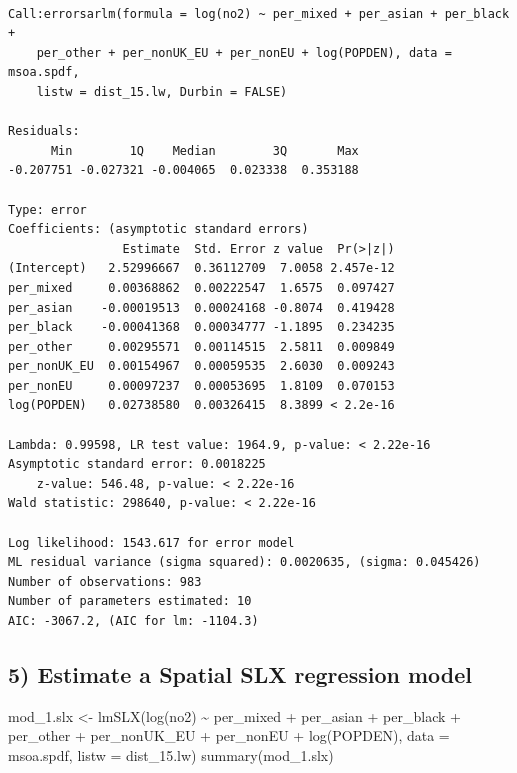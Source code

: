 \documentclass[
  letterpaper,
]{scrbook}
\newenvironment{Shaded}{\begin{snugshade}}{\end{snugshade}}
\newcommand{\AttributeTok}[1]{\textcolor[rgb]{0.40,0.45,0.13}{#1}}
\newcommand{\FunctionTok}[1]{\textcolor[rgb]{0.28,0.35,0.67}{#1}}
\newcommand{\NormalTok}[1]{\textcolor[rgb]{0.00,0.23,0.31}{#1}}
\newcommand{\OtherTok}[1]{\textcolor[rgb]{0.00,0.23,0.31}{#1}}
\newcommand{\SpecialCharTok}[1]{\textcolor[rgb]{0.37,0.37,0.37}{#1}}
\begin{document}
\begin{verbatim}

Call:errorsarlm(formula = log(no2) ~ per_mixed + per_asian + per_black + 
    per_other + per_nonUK_EU + per_nonEU + log(POPDEN), data = msoa.spdf, 
    listw = dist_15.lw, Durbin = FALSE)

Residuals:
      Min        1Q    Median        3Q       Max 
-0.207751 -0.027321 -0.004065  0.023338  0.353188 

Type: error 
Coefficients: (asymptotic standard errors) 
                Estimate  Std. Error z value  Pr(>|z|)
(Intercept)   2.52996667  0.36112709  7.0058 2.457e-12
per_mixed     0.00368862  0.00222547  1.6575  0.097427
per_asian    -0.00019513  0.00024168 -0.8074  0.419428
per_black    -0.00041368  0.00034777 -1.1895  0.234235
per_other     0.00295571  0.00114515  2.5811  0.009849
per_nonUK_EU  0.00154967  0.00059535  2.6030  0.009243
per_nonEU     0.00097237  0.00053695  1.8109  0.070153
log(POPDEN)   0.02738580  0.00326415  8.3899 < 2.2e-16

Lambda: 0.99598, LR test value: 1964.9, p-value: < 2.22e-16
Asymptotic standard error: 0.0018225
    z-value: 546.48, p-value: < 2.22e-16
Wald statistic: 298640, p-value: < 2.22e-16

Log likelihood: 1543.617 for error model
ML residual variance (sigma squared): 0.0020635, (sigma: 0.045426)
Number of observations: 983 
Number of parameters estimated: 10 
AIC: -3067.2, (AIC for lm: -1104.3)
\end{verbatim}

\hypertarget{estimate-a-spatial-slx-regression-model}{%
\subsection*{5) Estimate a Spatial SLX regression
model}\label{estimate-a-spatial-slx-regression-model}}

\begin{Shaded}
\begin{Highlighting}[]
\NormalTok{mod\_1.slx }\OtherTok{\textless{}{-}} \FunctionTok{lmSLX}\NormalTok{(}\FunctionTok{log}\NormalTok{(no2) }\SpecialCharTok{\textasciitilde{}}\NormalTok{ per\_mixed }\SpecialCharTok{+}\NormalTok{ per\_asian }\SpecialCharTok{+}\NormalTok{ per\_black }\SpecialCharTok{+}\NormalTok{ per\_other}
                      \SpecialCharTok{+}\NormalTok{ per\_nonUK\_EU }\SpecialCharTok{+}\NormalTok{ per\_nonEU  }\SpecialCharTok{+} \FunctionTok{log}\NormalTok{(POPDEN),  }
                      \AttributeTok{data =}\NormalTok{ msoa.spdf, }
                      \AttributeTok{listw =}\NormalTok{ dist\_15.lw)}
\FunctionTok{summary}\NormalTok{(mod\_1.slx)}
\end{Highlighting}
\end{Shaded}
\end{document}
